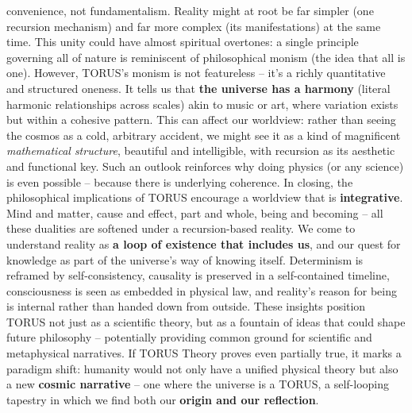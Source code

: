 \documentclass[]{article}
\begin{document}
\begin{itemize}
  convenience, not fundamentalism. Reality might at root be far simpler
  (one recursion mechanism) and far more complex (its manifestations) at
  the same time. This unity could have almost spiritual overtones: a
  single principle governing all of nature is reminiscent of
  philosophical monism (the idea that all is one). However, TORUS's
  monism is not featureless -- it's a richly quantitative and structured
  oneness. It tells us that \textbf{the universe has a harmony} (literal
  harmonic relationships across scales​) akin to music or art, where
  variation exists but within a cohesive pattern. This can affect our
  worldview: rather than seeing the cosmos as a cold, arbitrary
  accident, we might see it as a kind of magnificent \emph{mathematical
  structure}, beautiful and intelligible, with recursion as its
  aesthetic and functional key. Such an outlook reinforces why doing
  physics (or any science) is even possible -- because there is
  underlying coherence. In closing, the philosophical implications of
  TORUS encourage a worldview that is \textbf{integrative}. Mind and
  matter, cause and effect, part and whole, being and becoming -- all
  these dualities are softened under a recursion-based reality. We come
  to understand reality as \textbf{a loop of existence that includes
  us}, and our quest for knowledge as part of the universe's way of
  knowing itself. Determinism is reframed by self-consistency, causality
  is preserved in a self-contained timeline, consciousness is seen as
  embedded in physical law, and reality's reason for being is internal
  rather than handed down from outside. These insights position TORUS
  not just as a scientific theory, but as a fountain of ideas that could
  shape future philosophy -- potentially providing common ground for
  scientific and metaphysical narratives. If TORUS Theory proves even
  partially true, it marks a paradigm shift: humanity would not only
  have a unified physical theory but also a new \textbf{cosmic
  narrative} -- one where the universe is a TORUS, a self-looping
  tapestry in which we find both our \textbf{origin and our reflection}.
\end{itemize}
\end{document}
